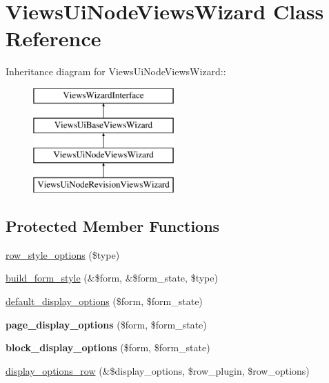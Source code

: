 \hypertarget{classViewsUiNodeViewsWizard}{
\section{ViewsUiNodeViewsWizard Class Reference}
\label{classViewsUiNodeViewsWizard}
}
Inheritance diagram for ViewsUiNodeViewsWizard::\begin{figure}[H]
\begin{center}
\leavevmode
\includegraphics[height=4cm]{classViewsUiNodeViewsWizard}
\end{center}
\end{figure}
\subsection*{Protected Member Functions}
\begin{DoxyCompactItemize}
\item 
\hyperlink{classViewsUiNodeViewsWizard_acc49f93c07b0fdcacccc4c7d6d62d9ed}{row\_\-style\_\-options} (\$type)
\item 
\hyperlink{classViewsUiNodeViewsWizard_a1c992c20ec060eddaba9b8e4ef76ef19}{build\_\-form\_\-style} (\&\$form, \&\$form\_\-state, \$type)
\item 
\hyperlink{classViewsUiNodeViewsWizard_a9272513dd5d6fc4bebfb85859cda7188}{default\_\-display\_\-options} (\$form, \$form\_\-state)
\item 
\hypertarget{classViewsUiNodeViewsWizard_ab96fe2bdb2cfaca02d2206af1b5618b6}{
{\bfseries page\_\-display\_\-options} (\$form, \$form\_\-state)}
\label{classViewsUiNodeViewsWizard_ab96fe2bdb2cfaca02d2206af1b5618b6}

\item 
\hypertarget{classViewsUiNodeViewsWizard_a512fc54418e14ab8a7689f66aa343c71}{
{\bfseries block\_\-display\_\-options} (\$form, \$form\_\-state)}
\label{classViewsUiNodeViewsWizard_a512fc54418e14ab8a7689f66aa343c71}

\item 
\hyperlink{classViewsUiNodeViewsWizard_aa02d9cffaec4012fdd13ffb9659ed2f2}{display\_\-options\_\-row} (\&\$display\_\-options, \$row\_\-plugin, \$row\_\-options)
\end{DoxyCompactItemize}


